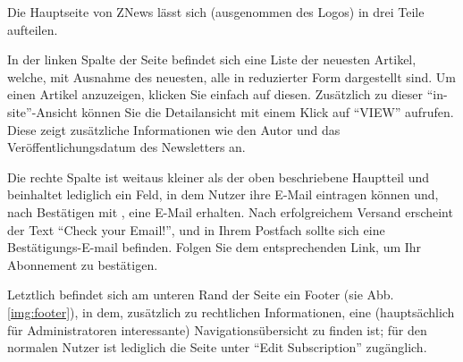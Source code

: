 Die Hauptseite von ZNews lässt sich
(ausgenommen des Logos)
in drei Teile aufteilen.

In der linken Spalte der Seite befindet sich eine Liste
der neuesten Artikel,
welche,
mit Ausnahme des neuesten,
alle in reduzierter Form dargestellt sind.
Um einen Artikel anzuzeigen,
klicken Sie einfach auf diesen.
Zusätzlich zu dieser ``in-site''-Ansicht
können Sie die Detailansicht mit einem Klick auf ``VIEW''
aufrufen.
Diese zeigt zusätzliche Informationen wie den Autor
und das Veröffentlichungsdatum des Newsletters an.

Die rechte Spalte ist weitaus kleiner als der oben beschriebene
Hauptteil und beinhaltet lediglich ein Feld,
in dem Nutzer ihre E-Mail eintragen können und,
nach Bestätigen mit ,
eine E-Mail erhalten.
Nach erfolgreichem Versand erscheint der Text
``Check your Email!'',
und in Ihrem Postfach sollte sich eine Bestätigungs-E-mail befinden.
Folgen Sie dem entsprechenden Link,
um Ihr Abonnement zu bestätigen.

Letztlich befindet sich am unteren Rand der Seite ein Footer
(sie Abb. \ref{img:footer}),
in dem,
zusätzlich zu rechtlichen Informationen,
eine (hauptsächlich für Administratoren interessante)
Navigationsübersicht zu finden ist;
für den normalen Nutzer ist lediglich die Seite
unter ``Edit Subscription'' zugänglich.

